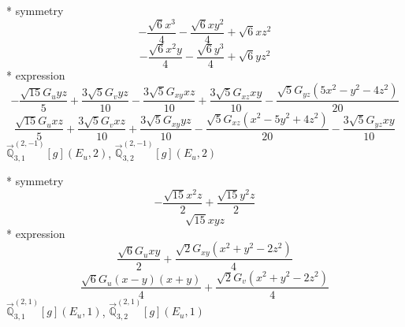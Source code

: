 \documentclass[fleqn,8pt]{jsarticle}
\begin{document}
\noindent\quad ** symmetry
\begin{dmath*}
- \frac{\sqrt{6} x^{3}}{4} - \frac{\sqrt{6} x y^{2}}{4} + \sqrt{6} x z^{2}
\end{dmath*}
\begin{dmath*}
- \frac{\sqrt{6} x^{2} y}{4} - \frac{\sqrt{6} y^{3}}{4} + \sqrt{6} y z^{2}
\end{dmath*}
\noindent\quad ** expression
\begin{dmath*}
- \frac{\sqrt{15} G_{u} y z}{5} + \frac{3 \sqrt{5} G_{v} y z}{10} - \frac{3 \sqrt{5} G_{xy} x z}{10} + \frac{3 \sqrt{5} G_{xz} x y}{10} - \frac{\sqrt{5} G_{yz} \left(5 x^{2} - y^{2} - 4 z^{2}\right)}{20}
\end{dmath*}
\begin{dmath*}
\frac{\sqrt{15} G_{u} x z}{5} + \frac{3 \sqrt{5} G_{v} x z}{10} + \frac{3 \sqrt{5} G_{xy} y z}{10} - \frac{\sqrt{5} G_{xz} \left(x^{2} - 5 y^{2} + 4 z^{2}\right)}{20} - \frac{3 \sqrt{5} G_{yz} x y}{10}
\end{dmath*}
\noindent\quad $\vec{\mathbb{Q}}_{3,1}^{(2,-1)}[g](E_{u},2)$, $\vec{\mathbb{Q}}_{3,2}^{(2,-1)}[g](E_{u},2)$

\noindent\quad ** symmetry
\begin{dmath*}
- \frac{\sqrt{15} x^{2} z}{2} + \frac{\sqrt{15} y^{2} z}{2}
\end{dmath*}
\begin{dmath*}
\sqrt{15} x y z
\end{dmath*}
\noindent\quad ** expression
\begin{dmath*}
\frac{\sqrt{6} G_{u} x y}{2} + \frac{\sqrt{2} G_{xy} \left(x^{2} + y^{2} - 2 z^{2}\right)}{4}
\end{dmath*}
\begin{dmath*}
\frac{\sqrt{6} G_{u} \left(x - y\right) \left(x + y\right)}{4} + \frac{\sqrt{2} G_{v} \left(x^{2} + y^{2} - 2 z^{2}\right)}{4}
\end{dmath*}
\noindent\quad $\vec{\mathbb{Q}}_{3,1}^{(2,1)}[g](E_{u},1)$, $\vec{\mathbb{Q}}_{3,2}^{(2,1)}[g](E_{u},1)$
\end{document}
